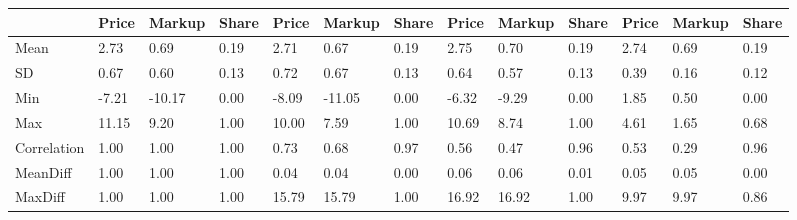 \begin{table}[htbp]
\begin{tabular}{lllllllllllll} \hline \hline
 & Price  & Markup  & Share  & Price  & Markup  & Share  & Price  & Markup  & Share  & Price  & Markup  & Share  \\  \hline 
Mean &      2.73 &      0.69 &      0.19 &      2.71 &      0.67 &      0.19 &      2.75 &      0.70 &      0.19 &      2.74 &      0.69 &      0.19 \\  
SD &      0.67 &      0.60 &      0.13 &      0.72 &      0.67 &      0.13 &      0.64 &      0.57 &      0.13 &      0.39 &      0.16 &      0.12 \\  
Min &     -7.21 &    -10.17 &      0.00 &     -8.09 &    -11.05 &      0.00 &     -6.32 &     -9.29 &      0.00 &      1.85 &      0.50 &      0.00 \\  
Max &     11.15 &      9.20 &      1.00 &     10.00 &      7.59 &      1.00 &     10.69 &      8.74 &      1.00 &      4.61 &      1.65 &      0.68 \\  
Correlation &      1.00 &      1.00 &      1.00 &      0.73 &      0.68 &      0.97 &      0.56 &      0.47 &      0.96 &      0.53 &      0.29 &      0.96 \\  
MeanDiff &      1.00 &      1.00 &      1.00 &      0.04 &      0.04 &      0.00 &      0.06 &      0.06 &      0.01 &      0.05 &      0.05 &      0.00 \\  
MaxDiff &      1.00 &      1.00 &      1.00 &     15.79 &     15.79 &      1.00 &     16.92 &     16.92 &      1.00 &      9.97 &      9.97 &      0.86 \\  
\hline \hline \end{tabular}
\end{table}
